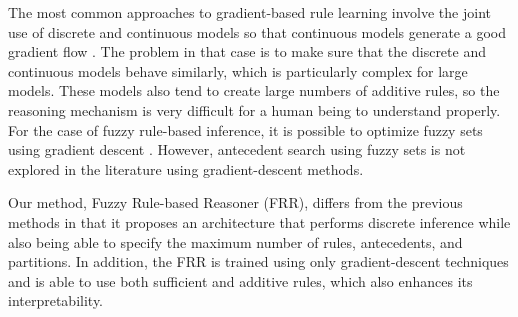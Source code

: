 The most common approaches to gradient-based rule learning involve the joint use of discrete and continuous models so that continuous models generate a good gradient flow \citep{wang2023learning, zhang2023learning}. The problem in that case is to make sure that the discrete and continuous models behave similarly, which is particularly complex for large models. These models also tend to create large numbers of additive rules, so the reasoning mechanism is very difficult for a human being to understand properly. For the case of fuzzy rule-based inference, it is possible to optimize fuzzy sets using gradient descent \citep{mendel2023explainable}. However, antecedent search using fuzzy sets is not explored in the literature using gradient-descent methods.

Our method, Fuzzy Rule-based Reasoner (FRR), differs from the previous methods in that it proposes an architecture that performs discrete inference while also being able to specify the maximum number of rules, antecedents, and partitions. In addition, the FRR is trained using only gradient-descent techniques and is able to use both sufficient and additive rules, which also enhances its interpretability.